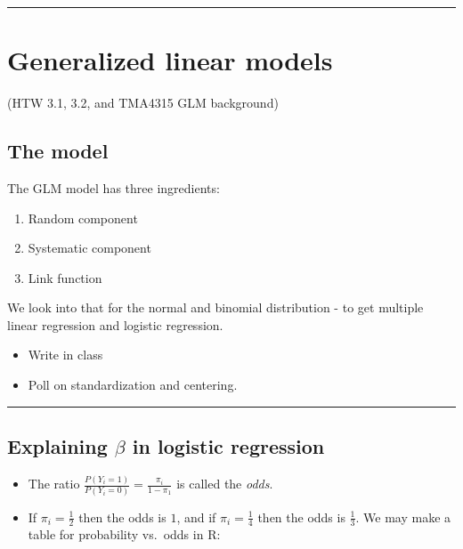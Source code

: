 \documentclass[
]{article}
\providecommand{\tightlist}{%
  \setlength{\itemsep}{0pt}\setlength{\parskip}{0pt}}
\begin{document}
\begin{center}\rule{0.5\linewidth}{0.5pt}\end{center}

\hypertarget{generalized-linear-models}{%
\section{Generalized linear models}\label{generalized-linear-models}}

(HTW 3.1, 3.2, and TMA4315 GLM background)

\hypertarget{the-model}{%
\subsection{The model}\label{the-model}}

The GLM model has three ingredients:

\begin{enumerate}
\def\labelenumi{\arabic{enumi})}
\tightlist
\item
  Random component
\item
  Systematic component
\item
  Link function
\end{enumerate}

We look into that for the normal and binomial distribution - to get
multiple linear regression and logistic regression.

\begin{itemize}
\tightlist
\item
  Write in class
\item
  Poll on standardization and centering.
\end{itemize}

\begin{center}\rule{0.5\linewidth}{0.5pt}\end{center}

\hypertarget{explaining-beta-in-logistic-regression}{%
\subsection{\texorpdfstring{Explaining \(\beta\) in logistic
regression}{Explaining \textbackslash beta in logistic regression}}\label{explaining-beta-in-logistic-regression}}

\begin{itemize}
\item
  The ratio \(\frac{P(Y_i=1)}{P(Y_i=0)}=\frac{\pi_i}{1-\pi_1}\) is
  called the \emph{odds}.
\item
  If \(\pi_i=\frac{1}{2}\) then the odds is \(1\), and if
  \(\pi_i=\frac{1}{4}\) then the odds is \(\frac{1}{3}\). We may make a
  table for probability vs.~odds in R:
\end{itemize}
\end{document}
